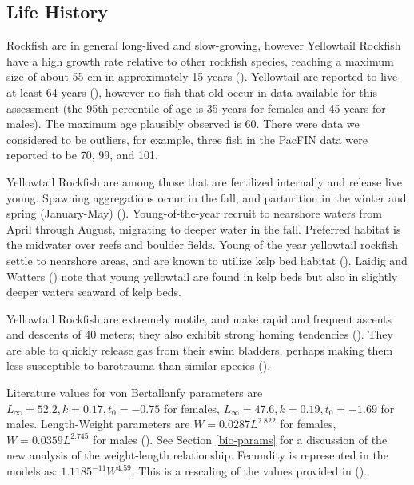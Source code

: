 \documentclass[
]{scrartcl}
\begin{document}
\subsection{Life History}\label{life-history}

Rockfish are in general long-lived and slow-growing, however Yellowtail
Rockfish have a high growth rate relative to other rockfish species,
reaching a maximum size of about 55 cm in approximately 15 years
(). Yellowtail are reported to
live at least 64 years (), however no
fish that old occur in data available for this assessment (the 95th
percentile of age is 35 years for females and 45 years for males). The
maximum age plausibly observed is 60. There were data we considered to
be outliers, for example, three fish in the PacFIN data were reported to
be 70, 99, and 101.

Yellowtail Rockfish are among those that are fertilized internally and
release live young. Spawning aggregations occur in the fall, and
parturition in the winter and spring (January-May)
(). Young-of-the-year
recruit to nearshore waters from April through August, migrating to
deeper water in the fall. Preferred habitat is the midwater over reefs
and boulder fields. Young of the year yellowtail rockfish settle to
nearshore areas, and are known to utilize kelp bed habitat
(). Laidig and Watters
() note that young yellowtail
are found in kelp beds but also in slightly deeper waters seaward of
kelp beds.

Yellowtail Rockfish are extremely motile, and make rapid and frequent
ascents and descents of 40 meters; they also exhibit strong homing
tendencies (). They are able to
quickly release gas from their swim bladders, perhaps making them less
susceptible to barotrauma than similar species
().

Literature values for von Bertallanfy parameters are
\(L_\infty = 52.2, k = 0.17, t_0 = -0.75\) for females,
\(L_\infty = 47.6, k=0.19, t_0 = -1.69\) for males. Length-Weight
parameters are \(W = 0.0287L^{2.822}\) for females,
\(W = 0.0359L^{2.745}\) for males ().
See Section \ref{bio-params} for a discussion of the new analysis of the
weight-length relationship. Fecundity is represented in the models as:
\(1.1185^{-11}W^{4.59}\). This is a rescaling of the values provided in
().
\end{document}
